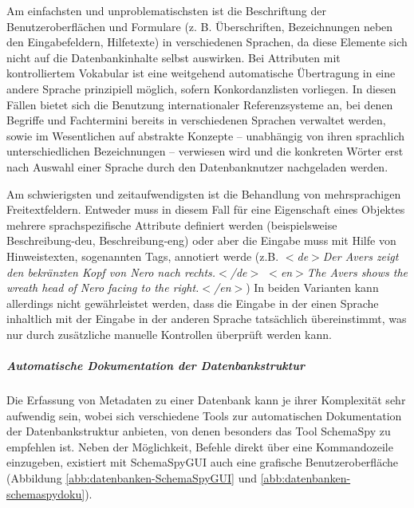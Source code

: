 Am einfachsten und unproblematischsten ist die Beschriftung der Benutzeroberflächen und Formulare (z. B. Überschriften, Bezeichnungen neben den Eingabefeldern, Hilfetexte) in verschiedenen Sprachen, da diese Elemente sich nicht auf die Datenbankinhalte selbst auswirken. Bei Attributen mit kontrolliertem Vokabular ist eine weitgehend automatische Übertragung in eine andere Sprache prinzipiell möglich, sofern Konkordanzlisten vorliegen. In diesen Fällen bietet sich die Benutzung internationaler Referenzsysteme an, bei denen Begriffe und Fachtermini bereits in verschiedenen Sprachen verwaltet werden, sowie im Wesentlichen auf abstrakte Konzepte -- unabhängig von ihren sprachlich unterschiedlichen Bezeichnungen -- verwiesen wird und die konkreten Wörter erst nach Auswahl einer Sprache durch den Datenbanknutzer nachgeladen werden. 

Am schwierigsten und zeitaufwendigsten ist die Behandlung von mehrsprachigen Freitextfeldern. Entweder muss in diesem Fall für eine Eigenschaft eines Objektes mehrere sprachspezifische Attribute definiert werden (beispielsweise Beschreibung-deu, Beschreibung-eng) oder aber die Eingabe muss mit Hilfe von Hinweistexten, sogenannten Tags, annotiert werde (z.B. \emph{$<$de$>$Der Avers zeigt den bekränzten Kopf von Nero nach rechts.$<$/de$>$ $<$en$>$The Avers shows the wreath head of Nero facing to the right.$<$/en$>$}) In beiden Varianten kann allerdings nicht gewährleistet werden, dass die Eingabe in der einen Sprache inhaltlich mit der Eingabe in der anderen Sprache tatsächlich übereinstimmt, was nur durch zusätzliche manuelle Kontrollen überprüft werden kann.


\subparagraph{Automatische Dokumentation der Datenbankstruktur}
Die Erfassung von Metadaten zu einer Datenbank kann je ihrer Komplexität sehr aufwendig sein, wobei sich verschiedene Tools zur automatischen Dokumentation der Datenbankstruktur anbieten, von denen besonders das Tool SchemaSpy zu empfehlen ist. Neben der Möglichkeit, Befehle direkt über eine Kommandozeile einzugeben, existiert mit SchemaSpyGUI auch eine grafische Benutzeroberfläche (Abbildung \ref{abb:datenbanken-SchemaSpyGUI} und \ref{abb:datenbanken-schemaspydoku}). 

